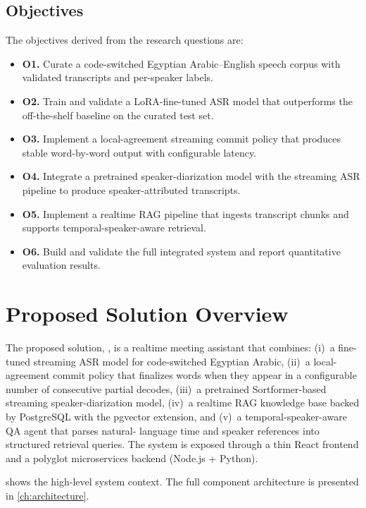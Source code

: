 \subsection{Objectives}

The objectives derived from the research questions are:

\begin{itemize}[itemsep=0.3em]
  \item \textbf{O1.} Curate a code-switched Egyptian Arabic--English speech
  corpus with validated transcripts and per-speaker labels.
  \item \textbf{O2.} Train and validate a LoRA-fine-tuned ASR model that
  outperforms the off-the-shelf baseline on the curated test set.
  \item \textbf{O3.} Implement a local-agreement streaming commit policy
  that produces stable word-by-word output with configurable latency.
  \item \textbf{O4.} Integrate a pretrained speaker-diarization model with
  the streaming ASR pipeline to produce speaker-attributed transcripts.
  \item \textbf{O5.} Implement a realtime RAG pipeline that ingests
  transcript chunks and supports temporal-speaker-aware retrieval.
  \item \textbf{O6.} Build and validate the full integrated system and
  report quantitative evaluation results.
\end{itemize}

\section{Proposed Solution Overview}
\label{sec:solution-overview}

The proposed solution, \meetai{}, is a realtime meeting assistant that
combines: (i)~a fine-tuned streaming ASR model for code-switched Egyptian
Arabic, (ii)~a local-agreement commit policy that finalizes words when they
appear in a configurable number of consecutive partial decodes, (iii)~a
pretrained Sortformer-based streaming speaker-diarization model, (iv)~a
realtime RAG knowledge base backed by PostgreSQL with the pgvector
extension, and (v)~a temporal-speaker-aware QA agent that parses natural-
language time and speaker references into structured retrieval queries. The
system is exposed through a thin React frontend and a polyglot
microservices backend (Node.js + Python).

 shows the high-level system context. The full
component architecture is presented in \cref{ch:architecture}.

